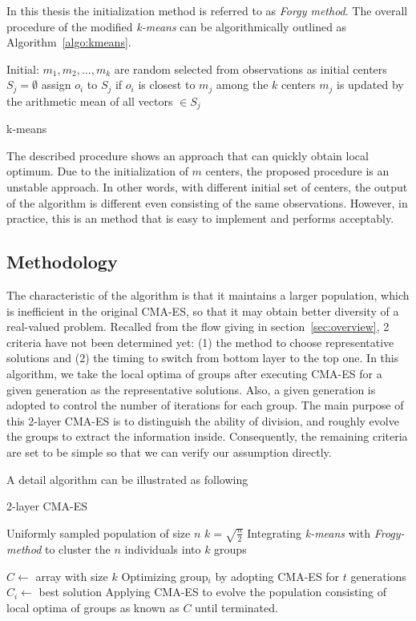 In this thesis the initialization method is referred to as \emph{Forgy method}.
The overall procedure of the modified \emph{k-means} can be algorithmically
outlined as Algorithm~\ref{algo:kmeans}.

\begin{algorithm}[H]
  \label{algo:kmeans}
	   Initial: $m_1, m_2,\ldots, m_k$ are
	random selected from observations as initial centers\;  {  { $S_j =
		\emptyset$	\; }  { assign $o_i$ to $S_j$ if $o_i$ is
		closest to $m_j$ among the $k$ centers\; }  { $m_j$ is
	updated by the arithmetic mean of all vectors $\in S_j$\; } } 
  \caption{k-means}
\end{algorithm}

The described procedure shows an approach that can quickly obtain local
optimum.
Due to the initialization of $m$ centers, the proposed procedure is an
unstable approach.
In other words, with different initial set of centers, the output of the
algorithm is different even consisting of the same observations.
However, in practice, this is an method that is easy to
implement and performs acceptably.


\subsection{Methodology}

The characteristic of the algorithm is that it maintains a larger
population, which is inefficient in the original CMA-ES, so that it may
obtain better diversity of a real-valued problem.
Recalled from the flow giving in section~\ref{sec:overview}, 2 criteria
have not been determined yet: (1) the method to choose representative
solutions and (2) the timing to switch from bottom layer to the top one.
In this algorithm, we take the local optima of groups after executing
CMA-ES for a given generation as the representative solutions.
Also, a given generation is adopted to control the number of iterations
for each group.
The main purpose of this 2-layer CMA-ES is to distinguish the ability of
division, and roughly evolve the groups to extract the information
inside.
Consequently, the remaining criteria are set to be simple so that we can
verify our assumption directly.

A detail algorithm can be illustrated as following\\
\begin{algorithm}[H]{
		\caption{2-layer CMA-ES}
    Uniformly sampled population of size $n$\;
    $k = \sqrt{\frac{n}{2}}$\;
    Integrating \emph{k-means} with \emph{Frogy-method} to cluster the
    $n$ individuals into $k$ groups\;

		$C\leftarrow$ array with size $k$\;
    {
      Optimizing group$_i$ by adopting CMA-ES for $t$ generations\;
			$C_i\leftarrow$ best solution\;
      Applying CMA-ES to evolve the population consisting of local
      optima of groups as known as $C$ until terminated.\;
    }
}
\end{algorithm}

